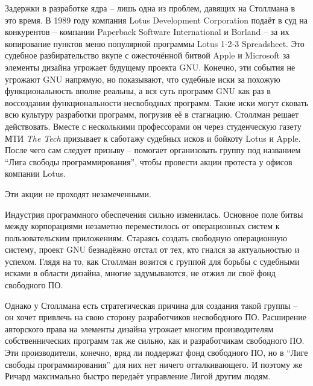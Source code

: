 Задержки в разработке ядра -- лишь одна из проблем, давящих на Столлмана в это время. В 1989 году компания Lotus Development Corporation подаёт в суд на конкурентов -- компании Paperback Software International и Borland -- за их копирование пунктов меню популярной программы Lotus 1-2-3 Spreadsheet. Это судебное разбирательство вкупе с ожесточённой битвой Apple и Microsoft за элементы дизайна угрожает будущему проекта GNU. Конечно, эти события не угрожают GNU напрямую, но показывают, что судебные иски за похожую функциональность вполне реальны, а вся суть программ GNU как раз в воссоздании функциональности несвободных программ. Такие иски могут сковать всю культуру разработки программ, погрузив её в стагнацию. Столлман решает действовать. Вместе с несколькими профессорами он через студенческую газету МТИ \textit{The Tech} призывает к саботажу судебных исков и бойкоту Lotus и Apple. После чего сам следует призыву -- помогает организовать группу под названием ``Лига свободы программирования'', чтобы провести акции протеста у офисов компании Lotus.

Эти акции не проходят незамеченными. 

Индустрия программного обеспечения сильно изменилась. Основное поле битвы между корпорациями незаметно переместилось от операционных систем к пользовательским приложениям. Стараясь создать свободную операционную систему, проект GNU безнадёжно отстал от тех, кто гнался за актуальностью и успехом. Глядя на то, как Столлман возится с группой для борьбы с судебными исками в области дизайна, многие задумываются, не отжил ли своё фонд свободного ПО.

Однако у Столлмана есть стратегическая причина для создания такой группы -- он хочет привлечь на свою сторону разработчиков несвободного ПО. Расширение авторского права на элементы дизайна угрожает многим производителям собственнических программ так же сильно, как и разработчикам свободного ПО. Эти производители, конечно, вряд ли поддержат фонд свободного ПО, но в ``Лиге свободы программирования'' для них нет ничего отталкивающего. И поэтому же Ричард максимально быстро передаёт управление Лигой другим людям.

